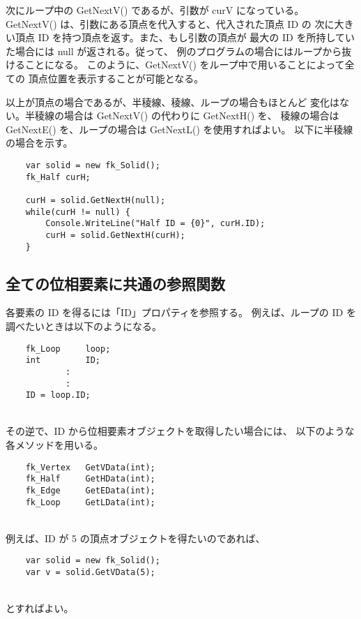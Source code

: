 次にループ中の GetNextV() であるが、引数が curV になっている。
GetNextV() は、引数にある頂点を代入すると、代入された頂点 ID の
次に大きい頂点 ID を持つ頂点を返す。また、もし引数の頂点が
最大の ID を所持していた場合には null が返される。従って、
例のプログラムの場合にはループから抜けることになる。
このように、GetNextV() をループ中で用いることによって全ての
頂点位置を表示することが可能となる。

以上が頂点の場合であるが、半稜線、稜線、ループの場合もほとんど
変化はない。半稜線の場合は GetNextV() の代わりに GetNextH() を、
稜線の場合は GetNextE() を、ループの場合は GetNextL() を使用すればよい。
以下に半稜線の場合を示す。
\\
\begin{breakbox}
\begin{verbatim}
    var solid = new fk_Solid();
    fk_Half curH;

    curH = solid.GetNextH(null);
    while(curH != null) {
        Console.WriteLine("Half ID = {0}", curH.ID);
        curH = solid.GetNextH(curH);
    }
\end{verbatim}
\end{breakbox}
\subsection{全ての位相要素に共通の参照関数}
各要素の ID を得るには「ID」プロパティを参照する。
例えば、ループの ID を調べたいときは以下のようになる。
\\
\begin{screen}
\begin{verbatim}
    fk_Loop     loop;
    int         ID;
            :
            :
    ID = loop.ID;
\end{verbatim}
\end{screen}
~ \\
その逆で、ID から位相要素オブジェクトを取得したい場合には、
以下のような各メソッドを用いる。
\\
\begin{screen}
\begin{verbatim}
    fk_Vertex   GetVData(int);
    fk_Half     GetHData(int);
    fk_Edge     GetEData(int);
    fk_Loop     GetLData(int);
\end{verbatim}
\end{screen}
~ \\
例えば、ID が 5 の頂点オブジェクトを得たいのであれば、
\\
\begin{screen}
\begin{verbatim}
    var solid = new fk_Solid();
    var v = solid.GetVData(5);
\end{verbatim}
\end{screen}
~ \\
とすればよい。
